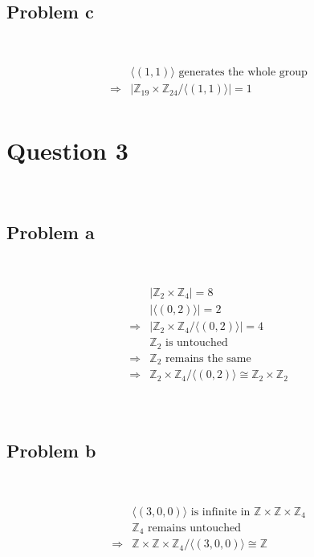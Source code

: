 \documentclass{article}
\begin{document}
~

\subsection*{Problem c}

~

\begin{equation*}
    \begin{split}
        &\langle(1,1)\rangle\text{ generates the whole group}\\
        \Rightarrow&|\mathbb{Z} _{19}\times\mathbb{Z} _{24}/\langle(1,1)\rangle|=1\\
    \end{split}
\end{equation*}

\newpage

\section*{Question 3}

~

\subsection*{Problem a}

~

\begin{equation*}
    \begin{split}
        &|\mathbb{Z} _2\times\mathbb{Z} _4|=8\\
        &|\langle(0,2)\rangle|=2\\
        \Rightarrow&|\mathbb{Z} _2\times\mathbb{Z} _4/\langle(0,2)\rangle|=4\\
        &\mathbb{Z} _2\text{ is untouched}\\
        \Rightarrow&\mathbb{Z} _2\text{ remains the same}\\
        \Rightarrow&\mathbb{Z} _2\times\mathbb{Z} _4/\langle(0,2)\rangle\cong \mathbb{Z} _2\times \mathbb{Z} _2\\
    \end{split}
\end{equation*}

~

\subsection*{Problem b}

~

\begin{equation*}
    \begin{split}
        &\langle(3,0,0)\rangle\text{ is infinite in }\mathbb{Z} \times\mathbb{Z} \times\mathbb{Z} _4\\
        &\mathbb{Z} _4\text{ remains untouched}\\
        \Rightarrow&\mathbb{Z} \times\mathbb{Z} \times\mathbb{Z} _4/\langle(3,0,0)\rangle\cong \mathbb{Z}\\
    \end{split}
\end{equation*}
\end{document}
